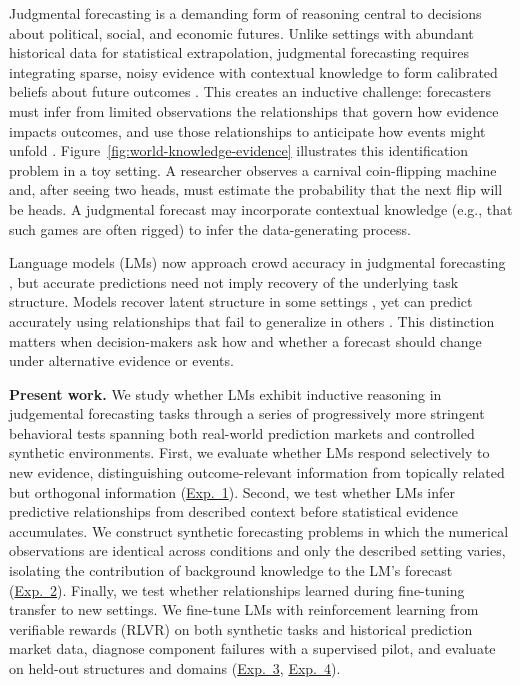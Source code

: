 \documentclass{article}
\begin{document}
Judgmental forecasting is a demanding form of reasoning central to decisions about political, social, and economic futures.
Unlike settings with abundant historical data for statistical extrapolation, judgmental forecasting requires integrating sparse, noisy evidence with contextual knowledge to form calibrated beliefs about future outcomes \citep{tetlock2016superforecasting,mellers2014psychological,lawrence2006judgmental}.
This creates an inductive challenge: forecasters must infer from limited observations the relationships that govern how evidence impacts outcomes, and use those relationships to anticipate how events might unfold \citep{tenenbaum2006theory,griffiths2010probabilistic,tenenbaum2011mind,lake2017building}.
Figure~\ref{fig:world-knowledge-evidence} illustrates this identification problem in a toy setting.
A researcher observes a carnival coin-flipping machine and, after seeing two heads, must estimate the probability that the next flip will be heads.
A judgmental forecast may incorporate contextual knowledge (e.g., that such games are often rigged) to infer the data-generating process.

Language models (LMs) now approach crowd accuracy in judgmental forecasting \citep{halawi2024approaching,schoenegger2024wisdom}, but accurate predictions need not imply recovery of the underlying task structure.
Models recover latent structure in some settings \citep{li2023emergent}, yet can predict accurately using relationships that fail to generalize in others \citep{vafa2025foundation}.
This distinction matters when decision-makers ask how and whether a forecast should change under alternative evidence or events.

\noindent
\textbf{Present work.}
We study whether LMs exhibit inductive reasoning in judgemental forecasting tasks through a series of progressively more stringent behavioral tests spanning both real-world prediction markets and controlled synthetic environments.
First, we evaluate whether LMs respond selectively to new evidence, distinguishing outcome-relevant information from topically related but orthogonal information (\hyperref[sec:exp1]{Exp.~1}).
Second, we test whether LMs infer predictive relationships from described context before statistical evidence accumulates.
We construct synthetic forecasting problems in which the numerical observations are identical across conditions and only the described setting varies, isolating the contribution of background knowledge to the LM's forecast (\hyperref[sec:exp2]{Exp.~2}).
Finally, we test whether relationships learned during fine-tuning transfer to new settings.
We fine-tune LMs with reinforcement learning from verifiable rewards (RLVR) on both synthetic tasks and historical prediction market data, diagnose component failures with a supervised pilot, and evaluate on held-out structures and domains (\hyperref[sec:exp3]{Exp.~3}, \hyperref[sec:exp4]{Exp.~4}).
\end{document}

